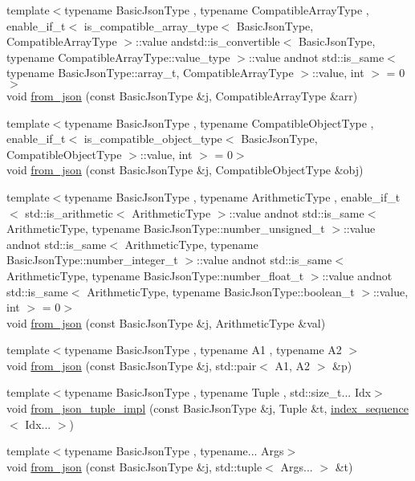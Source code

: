 \begin{DoxyCompactItemize}
\item 
{\footnotesize template$<$typename Basic\+Json\+Type , typename Compatible\+Array\+Type , enable\+\_\+if\+\_\+t$<$ is\+\_\+compatible\+\_\+array\+\_\+type$<$ Basic\+Json\+Type, Compatible\+Array\+Type $>$\+::value andstd\+::is\+\_\+convertible$<$ Basic\+Json\+Type, typename Compatible\+Array\+Type\+::value\+\_\+type $>$\+::value andnot std\+::is\+\_\+same$<$ typename Basic\+Json\+Type\+::array\+\_\+t, Compatible\+Array\+Type $>$\+::value, int $>$  = 0$>$ }\\void \hyperlink{namespacenlohmann_1_1detail_a8dcac00852dbe1f61d1e78135b19d428}{from\+\_\+json} (const Basic\+Json\+Type \&j, Compatible\+Array\+Type \&arr)
\item 
{\footnotesize template$<$typename Basic\+Json\+Type , typename Compatible\+Object\+Type , enable\+\_\+if\+\_\+t$<$ is\+\_\+compatible\+\_\+object\+\_\+type$<$ Basic\+Json\+Type, Compatible\+Object\+Type $>$\+::value, int $>$  = 0$>$ }\\void \hyperlink{namespacenlohmann_1_1detail_a5e7a3674e8ac46f8feebad9712d7c55f}{from\+\_\+json} (const Basic\+Json\+Type \&j, Compatible\+Object\+Type \&obj)
\item 
{\footnotesize template$<$typename Basic\+Json\+Type , typename Arithmetic\+Type , enable\+\_\+if\+\_\+t$<$ std\+::is\+\_\+arithmetic$<$ Arithmetic\+Type $>$\+::value andnot std\+::is\+\_\+same$<$ Arithmetic\+Type, typename Basic\+Json\+Type\+::number\+\_\+unsigned\+\_\+t $>$\+::value andnot std\+::is\+\_\+same$<$ Arithmetic\+Type, typename Basic\+Json\+Type\+::number\+\_\+integer\+\_\+t $>$\+::value andnot std\+::is\+\_\+same$<$ Arithmetic\+Type, typename Basic\+Json\+Type\+::number\+\_\+float\+\_\+t $>$\+::value andnot std\+::is\+\_\+same$<$ Arithmetic\+Type, typename Basic\+Json\+Type\+::boolean\+\_\+t $>$\+::value, int $>$  = 0$>$ }\\void \hyperlink{namespacenlohmann_1_1detail_a839b0ab50d2c9bce669068f56bc41202}{from\+\_\+json} (const Basic\+Json\+Type \&j, Arithmetic\+Type \&val)
\item 
{\footnotesize template$<$typename Basic\+Json\+Type , typename A1 , typename A2 $>$ }\\void \hyperlink{namespacenlohmann_1_1detail_aae9f9c2601074e323d49428132cc293d}{from\+\_\+json} (const Basic\+Json\+Type \&j, std\+::pair$<$ A1, A2 $>$ \&p)
\item 
{\footnotesize template$<$typename Basic\+Json\+Type , typename Tuple , std\+::size\+\_\+t... Idx$>$ }\\void \hyperlink{namespacenlohmann_1_1detail_a28253915d9db4a0112d60eaee0422949}{from\+\_\+json\+\_\+tuple\+\_\+impl} (const Basic\+Json\+Type \&j, Tuple \&t, \hyperlink{structnlohmann_1_1detail_1_1index__sequence}{index\+\_\+sequence}$<$ Idx... $>$)
\item 
{\footnotesize template$<$typename Basic\+Json\+Type , typename... Args$>$ }\\void \hyperlink{namespacenlohmann_1_1detail_a8b99ec9b29f3f20a18fc4281fb784e49}{from\+\_\+json} (const Basic\+Json\+Type \&j, std\+::tuple$<$ Args... $>$ \&t)
\end{DoxyCompactItemize}


